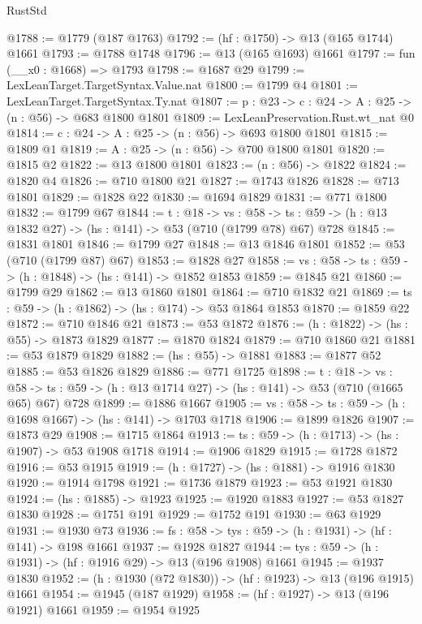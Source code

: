 \begin{lexlean}{RustStd}
\begin{coremodule}
@1788 := @1779 (@187 @1763)
@1792 := (hf : @1750) -> @13 (@165 @1744) @1661
@1793 := @1788 @1748
@1796 := @13 (@165 @1693) @1661
@1797 := fun (__x0 : @1668) => @1793
@1798 := @1687 @29
@1799 := LexLeanTarget.TargetSyntax.Value.nat
@1800 := @1799 @4
@1801 := LexLeanTarget.TargetSyntax.Ty.nat
@1807 := {p : @23} -> {c : @24} -> {A : @25} -> (n : @56) -> @683 @1800 @1801
@1809 := LexLeanPreservation.Rust.wt_nat @0
@1814 := {c : @24} -> {A : @25} -> (n : @56) -> @693 @1800 @1801
@1815 := @1809 @1
@1819 := {A : @25} -> (n : @56) -> @700 @1800 @1801
@1820 := @1815 @2
@1822 := @13 @1800 @1801
@1823 := (n : @56) -> @1822
@1824 := @1820 @4
@1826 := @710 @1800 @21
@1827 := @1743 @1826
@1828 := @713 @1801
@1829 := @1828 @22
@1830 := @1694 @1829
@1831 := @771 @1800
@1832 := @1799 @67
@1844 := {t : @18} ->
  {vs : @58} -> {ts : @59} -> (h : @13 @1832 @27) -> (hs : @141) -> @53 (@710 (@1799 @78) @67) @728
@1845 := @1831 @1801
@1846 := @1799 @27
@1848 := @13 @1846 @1801
@1852 := @53 (@710 (@1799 @87) @67)
@1853 := @1828 @27
@1858 := {vs : @58} -> {ts : @59} -> (h : @1848) -> (hs : @141) -> @1852 @1853
@1859 := @1845 @21
@1860 := @1799 @29
@1862 := @13 @1860 @1801
@1864 := @710 @1832 @21
@1869 := {ts : @59} -> (h : @1862) -> (hs : @174) -> @53 @1864 @1853
@1870 := @1859 @22
@1872 := @710 @1846 @21
@1873 := @53 @1872
@1876 := (h : @1822) -> (hs : @55) -> @1873 @1829
@1877 := @1870 @1824
@1879 := @710 @1860 @21
@1881 := @53 @1879 @1829
@1882 := (hs : @55) -> @1881
@1883 := @1877 @52
@1885 := @53 @1826 @1829
@1886 := @771 @1725
@1898 := {t : @18} ->
  {vs : @58} -> {ts : @59} -> (h : @13 @1714 @27) -> (hs : @141) -> @53 (@710 (@1665 @65) @67) @728
@1899 := @1886 @1667
@1905 := {vs : @58} -> {ts : @59} -> (h : @1698 @1667) -> (hs : @141) -> @1703 @1718
@1906 := @1899 @1826
@1907 := @1873 @29
@1908 := @1715 @1864
@1913 := {ts : @59} -> (h : @1713) -> (hs : @1907) -> @53 @1908 @1718
@1914 := @1906 @1829
@1915 := @1728 @1872
@1916 := @53 @1915
@1919 := (h : @1727) -> (hs : @1881) -> @1916 @1830
@1920 := @1914 @1798
@1921 := @1736 @1879
@1923 := @53 @1921 @1830
@1924 := (hs : @1885) -> @1923
@1925 := @1920 @1883
@1927 := @53 @1827 @1830
@1928 := @1751 @191
@1929 := @1752 @191
@1930 := @63 @1929
@1931 := @1930 @73
@1936 := {fs : @58} -> {tys : @59} -> (h : @1931) -> (hf : @141) -> @198 @1661
@1937 := @1928 @1827
@1944 := {tys : @59} -> (h : @1931) -> (hf : @1916 @29) -> @13 (@196 @1908) @1661
@1945 := @1937 @1830
@1952 := (h : @1930 (@72 @1830)) -> (hf : @1923) -> @13 (@196 @1915) @1661
@1954 := @1945 (@187 @1929)
@1958 := (hf : @1927) -> @13 (@196 @1921) @1661
@1959 := @1954 @1925

\end{coremodule}
\end{lexlean}
